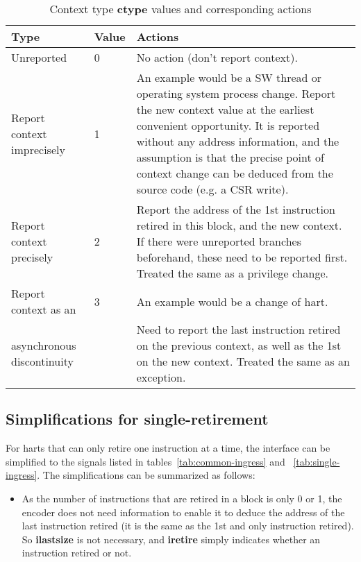 \begin{table}[htp]
    \centering
    \caption{Context type \textbf{ctype} values and corresponding actions}
    \label{tab:context-type}
    \begin{tabulary}{\textwidth}{|l|l|p{90mm}|}
        \hline
        \textbf{Type} & \textbf{Value} & \textbf{Actions} \\
        \hline
        Unreported & 0 & No action (don't report context).\\
        \hline
        Report context imprecisely & 1 & An example would be a SW thread or operating system process change.\newline
        Report the new context value at the earliest convenient opportunity.\newline
        It is reported without any address information, and the assumption is that the precise 
        point of context change can be deduced from the source code (e.g. a CSR write). \\
        \hline
        Report context precisely  & 2 & Report the address of the 1st instruction retired in this block, and the new context.\newline
        If there were unreported branches beforehand, these need to be reported first.\newline
        Treated the same as a privilege change.\\
        \hline
        Report context as an & 3 &  An example would be a change of hart.\\
        asynchronous discontinuity & & 
        Need to report the last instruction retired on the previous context, as well as the 1st on the new context.\newline
        Treated the same as an exception.\\
        \hline
    \end{tabulary}
\end{table}

\subsection{Simplifications for single-retirement} \label{sec:single-retire}

For harts that can only retire one instruction at a time, the interface can be simplified to
the signals listed in tables~\ref{tab:common-ingress} and ~\ref{tab:single-ingress}.  The 
simplifications can be summarized as follows:
 
\begin{itemize}
  \item As the number of instructions that are retired in a block is only 0 or 1, the 
    encoder does not need information to enable it to deduce the address of the last instruction 
    retired (it is the same as the 1st and only instruction retired).  So 
    \textbf{ilastsize} is not necessary, and \textbf{iretire} simply indicates whether an
    instruction retired or not.
\end{itemize}

